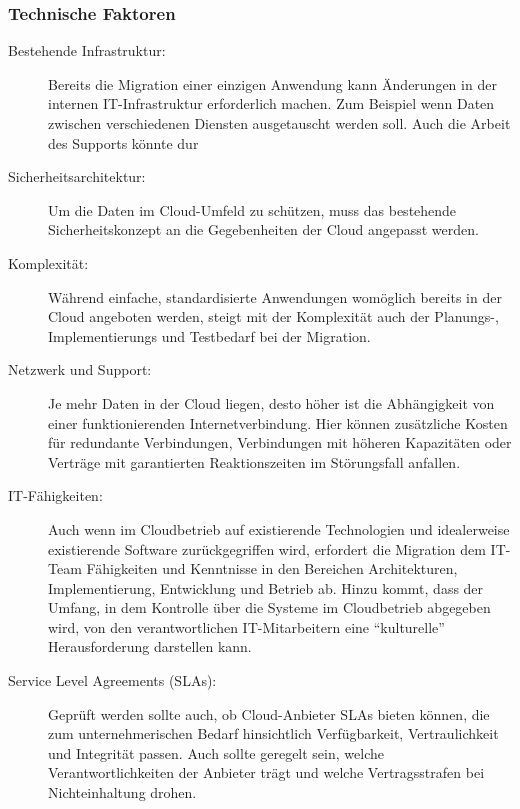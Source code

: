 \subsubsection{Technische Faktoren}
\begin{description}
	\item[Bestehende Infrastruktur:] Bereits die Migration einer 
einzigen Anwendung kann Änderungen in der internen IT-Infrastruktur 
erforderlich machen. Zum Beispiel wenn Daten zwischen verschiedenen Diensten 
ausgetauscht werden soll. Auch die Arbeit des Supports könnte dur
	
	\item[Sicherheitsarchitektur:] Um die Daten im Cloud-Umfeld zu 
schützen, muss das bestehende Sicherheitskonzept an die Gegebenheiten der Cloud 
angepasst werden.

	\item[Komplexität:]
	Während einfache, standardisierte Anwendungen womöglich bereits in der 
Cloud angeboten werden, steigt mit der Komplexität auch der Planungs-, 
Implementierungs und Testbedarf bei der Migration.
	
	\item[Netzwerk und Support:] Je mehr Daten in der Cloud liegen, desto 
höher ist die Abhängigkeit von einer funktionierenden Internetverbindung. Hier 
können zusätzliche Kosten für redundante Verbindungen, Verbindungen mit höheren 
Kapazitäten oder Verträge mit garantierten Reaktionszeiten im Störungsfall 
anfallen. 

	\item[IT-Fähigkeiten:] Auch wenn im Cloudbetrieb auf existierende 
Technologien und idealerweise existierende Software zurückgegriffen wird, 
erfordert die Migration dem IT-Team Fähigkeiten und Kenntnisse in den Bereichen 
Architekturen, Implementierung, Entwicklung und Betrieb ab. Hinzu kommt, dass 
der Umfang, in dem Kontrolle über die Systeme im Cloudbetrieb abgegeben wird, 
von den verantwortlichen IT-Mitarbeitern eine "`kulturelle"' Herausforderung 
darstellen kann.
	
	\item[Service Level Agreements (SLAs):] Geprüft werden sollte auch, ob 
Cloud-Anbieter SLAs bieten können, die zum unternehmerischen Bedarf 
hinsichtlich Verfügbarkeit, Vertraulichkeit und Integrität passen. Auch sollte 
geregelt sein, welche Verantwortlichkeiten der Anbieter trägt und welche 
Vertragsstrafen bei Nichteinhaltung drohen.
\end{description}

